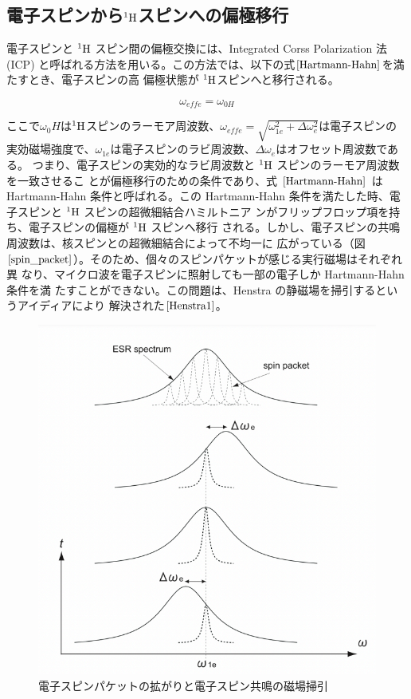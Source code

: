 \subsection{電子スピンから${}^1\rm{H}$スピンへの偏極移行}
電子スピンと ${}^1\rm{H}$ スピン間の偏極交換には、Integrated Corss Polarization 法 (ICP)
と呼ばれる方法を用いる。この方法では、以下の式$\ref{Hartmann-Hahn}$を満たすとき、電子スピンの高
偏極状態が  ${}^1\rm{H}$スピンへと移行される。

\begin{equation}
  \omega_{eff e}=\omega_{0 H}
  \label{Hartmann-Hahn}
\end{equation}

ここで$\omega_0 H$は${}^1\rm{H}$スピンのラーモア周波数、$\omega_{eff e}=\sqrt{\omega^2_{1e}+\Delta\omega^2_e}$は電子スピンの実効磁場強度で、$\omega_{1e}$は電子スピンのラビ周波数、$\Delta\omega_e$はオフセット周波数である。
つまり、電子スピンの実効的なラビ周波数と ${}^1\rm{H}$ スピンのラーモア周波数を一致させるこ
とが偏極移行のための条件であり、式 $\ref{Hartmann-Hahn}$ は Hartmann-Hahn 条件と呼ばれる。この
Hartmann-Hahn 条件を満たした時、電子スピンと ${}^1\rm{H}$ スピンの超微細結合ハミルトニア
ンがフリップフロップ項を持ち、電子スピンの偏極が ${}^1\rm{H}$ スピンへ移行
される。しかし、電子スピンの共鳴周波数は、核スピンとの超微細結合によって不均一に
広がっている（図$\ref{spin_packet}$）。そのため、個々のスピンパケットが感じる実行磁場はそれぞれ異
なり、マイクロ波を電子スピンに照射しても一部の電子しか Hartmann-Hahn 条件を満
たすことができない。この問題は、Henstra の静磁場を掃引するというアイディアにより
解決された$\cite{Henstra1}$。

\begin{figure}[ht]
  \centering
  \includegraphics[keepaspectratio, scale=0.5]
       {./chap2/fig/spin_packet.png}
  \caption{電子スピンパケットの拡がりと電子スピン共鳴の磁場掃引}
  \label{spin_packet}
 \end{figure}

